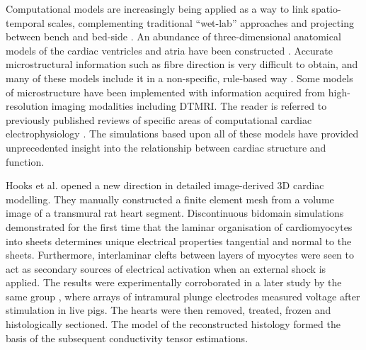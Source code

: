   Computational models are increasingly being applied as a way to link spatio-temporal scales, complementing traditional “wet-lab” approaches and projecting between bench and bed-side \cite{Hunter2010,Kohl2010}. An abundance of three-dimensional anatomical models of the cardiac ventricles and atria have been constructed \cite{Eason1998,Kanai1995,Vetter2005,DeBakker2005,Atkinson2011,Baher2011,Bishop2009,Bishop2012,Bordas2010,Bordas2011,Deo2009,Keller2012,Moreno2011,Niederer2011,Okada2011,Potse2006,Romero2010,Seemann2006,TenTusscher2007,Trayanova2011,Vadakkumpadan2010,Zemzemi2011,Zhao2012,Plotkowiak2008}. Accurate microstructural information such as fibre direction is very difficult to obtain, and many of these models include it in a non-specific, rule-based way \cite{StreeterJr1969}. Some models of microstructure have been implemented with information acquired from high-resolution imaging modalities including DTMRI. The reader is referred to previously published reviews of specific areas of computational cardiac electrophysiology \cite{Rudy2006,Brennan2009,Clayton2010,Clayton2011,Greenstein2011,Trayanova2011,Carusi2012}. The simulations based upon all of these models have provided unprecedented insight into the relationship between cardiac structure and function.

    
  Hooks et al. \cite{Hooks2002} opened a new direction in detailed image-derived 3D cardiac modelling. They manually constructed a finite element mesh from a volume image of a transmural rat heart segment.  Discontinuous bidomain simulations demonstrated for the first time that the laminar organisation of cardiomyocytes into sheets determines unique electrical properties tangential and normal to the sheets. Furthermore, interlaminar clefts between layers of myocytes were seen to act as secondary sources of electrical activation when an external shock is applied. The results were experimentally corroborated in a later study by the same group \cite{Hooks2007}, where arrays of intramural plunge electrodes measured voltage after stimulation in live pigs. The hearts were then removed, treated, frozen and histologically sectioned. The model of the reconstructed histology formed the basis of the subsequent conductivity tensor estimations.
  
